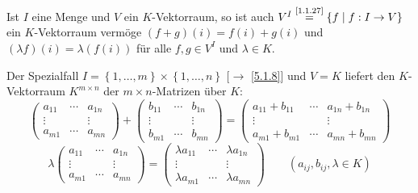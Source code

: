 \documentclass[../../main.tex]{subfiles}
\begin{document}
\begin{er}\label{7.1.5}
Ist $I$ eine Menge und $V$ ein $K$-Vektorraum, so ist auch $V^I \overset{\text{\ref{1.1.27}}}{=}\left\{f\mid f:I\to V\right\}$ ein $K$-Vektorraum vermöge $(f+g)(i) = f(i) + g(i)$ und $(\lambda f)(i) = \lambda (f(i))$ für alle $f,g\in V^I$ und $\lambda\in K$.

Der Spezialfall $I= \left\{1,\ldots,m\right\}\times \left\{1,\ldots,n\right\}$ [$\to$ \ref{5.1.8}] und $V=K$ liefert den $K$-Vektorraum $K^{m\times n}$ der $m\times n$-Matrizen über $K$:
$$
\begin{pmatrix}
a_{11} & \cdots & a_{1n}\\
\vdots & & \vdots\\
a_{m1} & \cdots & a_{mn}
\end{pmatrix} + \begin{pmatrix}
b_{11} & \cdots & b_{1n}\\
\vdots & & \vdots\\
b_{m1} & \cdots & b_{mn}
\end{pmatrix} = \begin{pmatrix}
a_{11}+b_{11} & \cdots & a_{1n}+b_{1n}\\
\vdots & & \vdots\\
a_{m1}+b_{m1} & \cdots & a_{mn}+b_{mn}
\end{pmatrix}
$$
$$\lambda \begin{pmatrix}
a_{11} & \cdots & a_{1n}\\
\vdots & & \vdots\\
a_{m1} & \cdots & a_{mn}
\end{pmatrix} = \begin{pmatrix}
\lambda a_{11} & \cdots & \lambda a_{1n}\\
\vdots & & \vdots\\
\lambda a_{m1} & \cdots & \lambda a_{mn}
\end{pmatrix} \qquad (a_{ij}, b_{ij},\lambda\in K)$$
\end{er}
\end{document}
